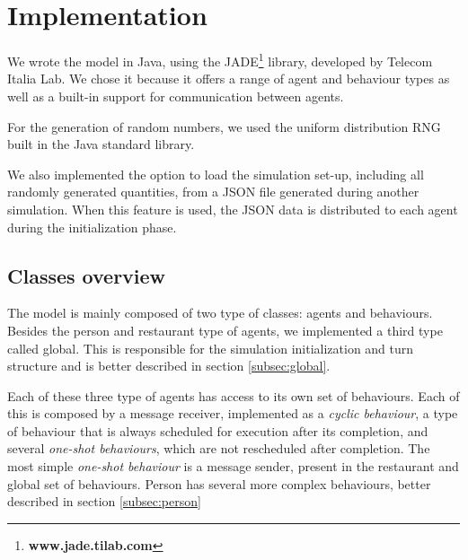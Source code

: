 \documentclass[10pt,a4paper,usenatbib]{article}
\begin{document}
\pagebreak

\section{Implementation}
\label{sec:implementation}
We wrote the model in Java, using the JADE\footnote{\textbf{www.jade.tilab.com}} library, developed by Telecom Italia Lab. We chose it because it offers a range of agent and behaviour types as well as a built-in support for communication between agents.

For the generation of random numbers, we used the uniform distribution RNG built in the Java standard library.

We also implemented the option to load the simulation set-up, including all randomly generated quantities, from a JSON file generated during another simulation. When this feature is used, the JSON data is distributed   to each agent during the initialization phase.
\subsection{Classes overview}
The model is mainly composed of two type of classes: agents and behaviours. 
Besides the person and restaurant type of agents, we implemented a third type called global. This is responsible for the simulation initialization and turn structure and is better described in section \ref{subsec:global}.

Each of these three type of agents has access to its own set of behaviours. Each of this is composed by a message receiver, implemented as a \textit{cyclic behaviour}, a type of behaviour that is always scheduled for execution after its completion, and several \textit{one-shot behaviours}, which are not rescheduled after completion. The most simple \textit{one-shot behaviour} is a message sender, present in the restaurant and global set of behaviours. Person has several more complex behaviours, better described in section \ref{subsec:person}
\end{document}
